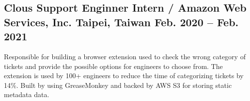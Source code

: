 \subsection{{Clous Support Enginner Intern / Amazon Web Services, Inc. \hfill Taipei, Taiwan \> Feb. 2020 -- Feb. 2021}}

\begin{zitemize}
\item Responsible for building a browser extension used to check the wrong category of tickets and provide the possible options for engineers to choose from. The extension is used by 100+ engineers to reduce the time of categorizing tickets by 14\%. Built by using GreaseMonkey and backed by AWS S3 for storing static metadata data.
\end{zitemize}

